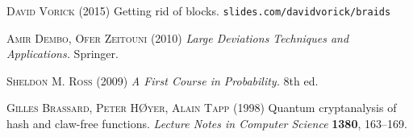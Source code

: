 \documentclass[12pt]{article}
\begin{document}
\begin{CJK}{UTF8}{bkai}
\begin{thebibliography}{9}
\textsc{David Vorick} (2015)
Getting rid of blocks.
\texttt{slides.com/davidvorick/braids}


\textsc{Amir Dembo, Ofer Zeitouni} (2010)
\textit{Large Deviations Techniques and Applications.}
Springer.

 \textsc{Sheldon M. Ross} (2009) 
\textit{A First Course in Probability.} 8th ed.

 \textsc{Gilles Brassard, Peter HØyer, Alain Tapp} (1998)
Quantum cryptanalysis of hash and claw-free functions.
\textit{Lecture Notes in Computer Science} \textbf{1380},
163--169.


\end{thebibliography}
\end{CJK}
\end{document}
